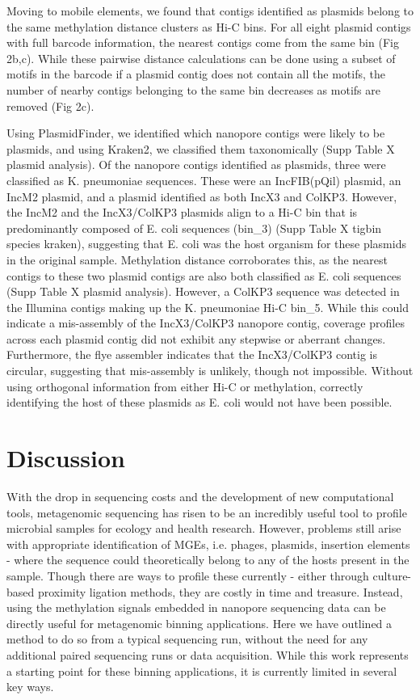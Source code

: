Moving to mobile elements, we found that contigs identified as plasmids belong to the same methylation distance clusters as Hi-C bins.  For all eight plasmid contigs with full barcode information,  the nearest contigs come from the same bin (Fig 2b,c). While these pairwise distance calculations can be done using a subset of motifs in the barcode if a plasmid contig does not contain all the motifs, the number of nearby contigs belonging to the same bin decreases as motifs are removed (Fig 2c).

Using PlasmidFinder, we identified which nanopore contigs were likely to be plasmids, and using Kraken2, we classified them taxonomically (Supp Table X plasmid analysis). Of the nanopore contigs identified as plasmids, three were classified as K. pneumoniae sequences. These were an IncFIB(pQil) plasmid, an IncM2 plasmid, and a plasmid identified as both IncX3 and ColKP3. However, the IncM2 and the IncX3/ColKP3 plasmids align to a Hi-C bin that is predominantly composed of E. coli sequences (bin\_3) (Supp Table X tigbin species kraken), suggesting that E. coli was the host organism for these plasmids in the original sample. Methylation distance corroborates this, as the nearest contigs to these two plasmid contigs are also both classified as E. coli sequences (Supp Table X plasmid analysis). However, a ColKP3 sequence was detected in the Illumina contigs making up the K. pneumoniae Hi-C bin\_5. While this could indicate a mis-assembly of the IncX3/ColKP3 nanopore contig, coverage profiles across each plasmid contig did not exhibit any stepwise or aberrant changes. Furthermore, the flye assembler indicates that the IncX3/ColKP3 contig is circular, suggesting that mis-assembly is unlikely, though not impossible. Without using orthogonal information from either Hi-C or methylation, correctly identifying the host of these plasmids as E. coli would not have been possible.

\section{Discussion}
\label{sec:discuss}

With the drop in sequencing costs and the development of new computational tools, metagenomic sequencing has risen to be an incredibly useful tool to profile microbial samples for ecology and health research. However, problems still arise with appropriate identification of MGEs, i.e. phages, plasmids, insertion elements - where the sequence could theoretically belong to any of the hosts present in the sample. Though there are ways to profile these currently - either through culture-based proximity ligation methods, they are costly in time and treasure. Instead, using the methylation signals embedded in nanopore sequencing data can be directly useful for metagenomic binning applications. Here we have outlined a method to do so from a typical sequencing run, without the need for any additional paired sequencing runs or data acquisition. While this work represents a starting point for these binning applications, it is currently limited in several key ways.

